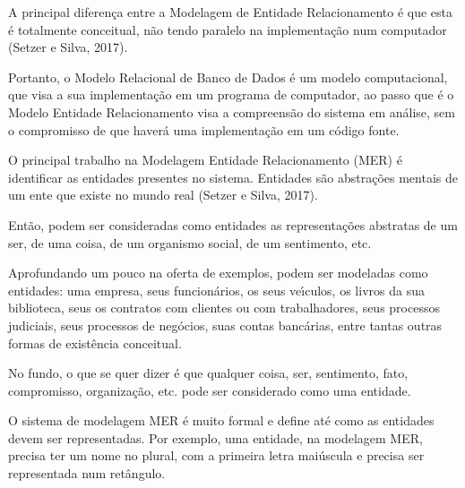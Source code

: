 \documentclass[
12pt,		%
openright,	%
twoside,  %
a4paper,			%
chapter=TITLE,		%
english,			%
french,				%
spanish,			%
brazil				%
]{USPSC-classe/USPSC_RedarTex}
\begin{document}
A principal diferen\c{c}a entre a Modelagem de Entidade Relacionamento \'e que esta \'e totalmente conceitual, n\~ao tendo paralelo na implementa\c{c}\~ao num computador  (Setzer e Silva, 2017).








Portanto, o Modelo Relacional de Banco de Dados \'e um modelo computacional, que visa a sua implementa\c{c}\~ao em um programa de computador, ao passo que \'e o Modelo Entidade Relacionamento visa a compreens\~ao do sistema em an\'alise, sem o compromisso de que haver\'a uma implementa\c{c}\~ao em um c\'odigo fonte.








O principal trabalho na Modelagem Entidade Relacionamento (MER) \'e identificar as entidades presentes no sistema. Entidades s\~ao abstra\c{c}\~oes mentais de um ente que existe no mundo real  (Setzer e Silva, 2017).








Ent\~ao, podem ser consideradas como entidades as representa\c{c}\~oes abstratas de um ser, de uma coisa, de um organismo social, de um sentimento, etc.








Aprofundando um pouco na oferta de exemplos, podem ser modeladas como entidades: uma empresa, seus funcion\'arios, os seus ve\'{\i}culos, os livros da sua biblioteca, seus os contratos com clientes ou com trabalhadores, seus processos judiciais, seus processos de neg\'ocios, suas contas banc\'arias, entre tantas outras formas de exist\^encia conceitual.








No fundo, o que se quer dizer \'e que qualquer coisa, ser, sentimento, fato, compromisso, organiza\c{c}\~ao, etc. pode ser considerado como uma entidade.








O sistema de modelagem MER \'e muito formal e define at\'e como as entidades devem ser representadas. Por exemplo, uma entidade, na modelagem MER, precisa ter um nome no plural, com a primeira letra mai\'uscula e precisa ser representada num ret\^angulo.
\end{document}
